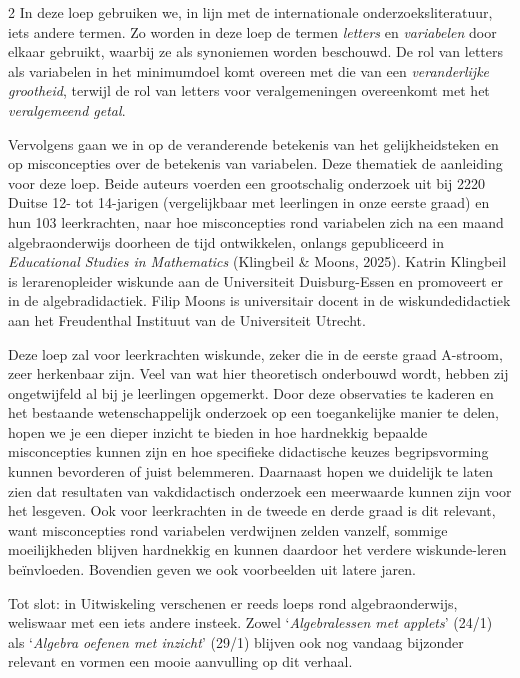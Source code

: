 \begin{multicols}{2}
In deze loep gebruiken we, in lijn met de internationale onderzoeksliteratuur, iets andere termen. Zo worden in deze loep de termen \textit{letters} en \textit{variabelen} door elkaar gebruikt, waarbij ze als synoniemen worden beschouwd. De rol van letters als variabelen in het minimumdoel komt overeen met die van een \textit{veranderlijke grootheid}, terwijl de rol van letters voor veralgemeningen overeenkomt met het \textit{veralgemeend getal}.

Vervolgens gaan we in op de veranderende betekenis van het gelijkheidsteken en op misconcepties over de betekenis van variabelen. Deze thematiek de aanleiding voor deze loep. Beide auteurs voerden een grootschalig onderzoek uit bij 2220 Duitse 12- tot 14-jarigen (vergelijkbaar met leerlingen in onze eerste graad) en hun 103 leerkrachten, naar hoe misconcepties rond variabelen zich na een maand algebraonderwijs doorheen de tijd ontwikkelen, onlangs gepubliceerd in \textit{Educational Studies in Mathematics} (Klingbeil \& Moons, 2025). Katrin Klingbeil is lerarenopleider wiskunde aan de Universiteit Duisburg-Essen en promoveert er in de algebradidactiek. Filip Moons is universitair docent in de wiskundedidactiek aan het Freudenthal Instituut van de Universiteit Utrecht. 

Deze loep zal voor leerkrachten wiskunde, zeker die in de eerste graad A-stroom, zeer herkenbaar zijn. Veel van wat hier theoretisch onderbouwd wordt, hebben zij ongetwijfeld al bij je leerlingen opgemerkt. Door deze observaties te kaderen en het bestaande wetenschappelijk onderzoek op een toegankelijke manier te delen, hopen we je een dieper inzicht te bieden in hoe hardnekkig bepaalde misconcepties kunnen zijn en hoe specifieke didactische keuzes begripsvorming kunnen bevorderen of juist belemmeren. Daarnaast hopen we duidelijk te laten zien dat resultaten van vakdidactisch onderzoek een meerwaarde kunnen zijn voor het lesgeven. Ook voor leerkrachten in de tweede en derde graad is dit relevant, want misconcepties rond variabelen verdwijnen zelden vanzelf, sommige moeilijkheden blijven hardnekkig en kunnen daardoor het verdere wiskunde-leren beïnvloeden. Bovendien geven we ook voorbeelden uit latere jaren.

Tot slot: in Uitwiskeling verschenen er reeds loeps rond algebraonderwijs, weliswaar met een iets andere insteek. Zowel `\textit{Algebralessen met applets}' (24/1) als `\textit{Algebra oefenen met inzicht}' (29/1) blijven ook nog vandaag bijzonder relevant en vormen een mooie aanvulling op dit verhaal.


\end{multicols}
